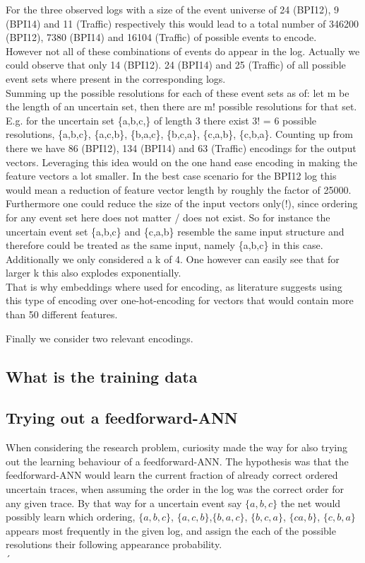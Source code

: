 \documentclass[
	a4paper,
	pagesize,
	pdftex,
	12pt,
	ngerman,
	fleqn,
	final,
	]{scrartcl}
\theoremstyle{plain}
\theoremstyle{definition}
\begin{document}
	For the three observed logs with a size of the event universe of 24 (BPI12), 9 (BPI14) and 11 (Traffic) respectively this would lead to a total number of 346200 (BPI12), 7380 (BPI14) and 16104 (Traffic) of possible events to encode. \\
	However not all of these combinations of events do appear in the log. Actually we could observe that only 14 (BPI12). 24 (BPI14) and 25 (Traffic) of all possible event sets where present in the corresponding logs. \\
	Summing up the possible resolutions for each of these event sets as of: let m be the length of an uncertain set, then there are m! possible resolutions for that set. E.g. for the uncertain set \{a,b,c,\} of length 3 there exist 3! = 6 possible resolutions, \{a,b,c\}, \{a,c,b\}, \{b,a,c\}, \{b,c,a\}, \{c,a,b\}, \{c,b,a\}. Counting up from there we have 86 (BPI12), 134 (BPI14) and 63 (Traffic) encodings for the output vectors.
	Leveraging this idea would on the one hand ease encoding in making the feature vectors a lot smaller. In the best case scenario for the BPI12 log this would mean a reduction of feature vector length by roughly the factor of 25000. \\ 
	Furthermore one could reduce the size of the input vectors only(!), since ordering for any event set here does not matter / does not exist. So for instance the uncertain event set \{a,b,c\} and \{c,a,b\} resemble the same input structure and therefore could be treated as the same input, namely \{a,b,c\} in this case. \\
	Additionally we only considered a k of 4. One however can easily see that for larger k this also explodes exponentially. \\
	That is why embeddings where used for encoding, as literature suggests using this type of encoding over one-hot-encoding for vectors that would contain more than 50 different features.
	
	Finally we consider two relevant encodings.
	
	\subsection{What is the training data}
	 
	
	\subsection{Trying out a feedforward-ANN}
	When considering the research problem, curiosity made the way for also trying out the learning behaviour of a feedforward-ANN. 
	The hypothesis was that the feedforward-ANN would learn the current fraction of already correct ordered uncertain traces, when assuming the order in the log was the correct order for any given trace. By that way for a uncertain event say \(\{a, b, c\}\) the net would possibly learn which ordering, \(\{a, b, c\}\),  \(\{a, c, b\}\),\(\{b, a, c\}\), \(\{b, c, a\}\), \(\{c a, b\}\), \(\{c, b, a\}\) appears most frequently in the given log, and assign the each of the possible resolutions their following appearance probability. \\
	´
\end{document}
